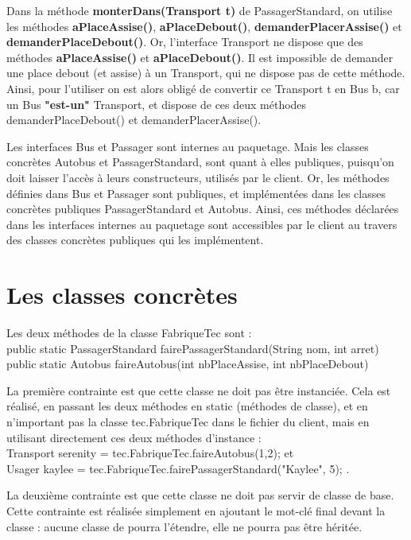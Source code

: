 \documentclass[a4paper,11pt]{article}
\begin{document}
Dans la méthode \textbf{monterDans(Transport t)} de PassagerStandard, on utilise les méthodes \textbf{aPlaceAssise()}, \textbf{aPlaceDebout()}, 
\textbf{demanderPlacerAssise()} et \textbf{demanderPlaceDebout()}. Or, l'interface Transport ne dispose que des méthodes \textbf{aPlaceAssise()} et 
\textbf{aPlaceDebout()}. Il est impossible de demander une place debout (et assise) à un Transport, qui ne dispose pas de cette méthode. Ainsi, pour l'utiliser on 
est alors obligé de convertir ce Transport t en Bus b, car un Bus \textbf{"est-un"} Transport, et dispose de ces deux méthodes demanderPlaceDebout() et 
demanderPlacerAssise().

Les interfaces Bus et Passager sont internes au paquetage. Mais les classes concrètes Autobus et PassagerStandard, sont quant à elles publiques, puisqu'on doit 
laisser l'accès à leurs constructeurs, utilisés par le client. Or, les méthodes définies dans Bus et Passager sont publiques, et implémentées dans les classes 
concrètes publiques PassagerStandard et Autobus. Ainsi, ces méthodes déclarées dans les interfaces internes au paquetage sont accessibles par le client au travers 
des classes concrètes publiques qui les implémentent.

\section{Les classes concrètes}

Les deux méthodes de la classe FabriqueTec sont :\\
public static PassagerStandard fairePassagerStandard(String nom, int arret)\\
public static Autobus faireAutobus(int nbPlaceAssise, int nbPlaceDebout)

La première contrainte est que cette classe ne doit pas être instanciée. Cela est réalisé, en passant les deux méthodes en static (méthodes de classe), et en 
n'important pas la classe tec.FabriqueTec dans le fichier du client, mais en utilisant directement ces deux méthodes d'instance : \\
Transport serenity = tec.FabriqueTec.faireAutobus(1,2); et \\
Usager kaylee = tec.FabriqueTec.fairePassagerStandard("Kaylee", 5); .

La deuxième contrainte est que cette classe ne doit pas servir de classe de base. Cette contrainte est réalisée simplement en ajoutant le mot-clé final devant la 
classe : aucune classe de pourra l'étendre, elle ne pourra pas être héritée.
\end{document}
